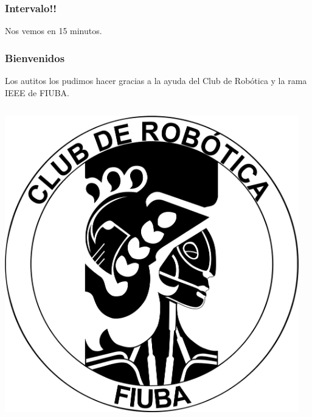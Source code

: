 \documentclass[compress]{beamer}
\begin{document}
\begin{frame}
 \frametitle{Intervalo!!}
\vspace{2cm}
\begin{center}
\Huge{Nos vemos en 15 minutos.}
\end{center}
\vspace{2cm}
\end{frame}

\begin{frame}
 \frametitle{Bienvenidos}

Los autitos los pudimos hacer gracias a la ayuda del Club de Robótica y la rama IEEE de FIUBA.
\begin{columns}
\begin{center}
 \includegraphics[width=\columnwidth]{./img/cdrfiuba.png}
\end{center}
\begin{center}
\end{center}
\end{columns}

\end{frame}
\end{document}
